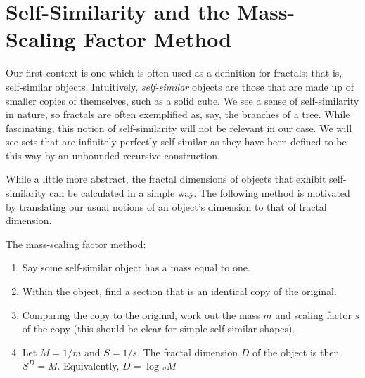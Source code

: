 \section{Self-Similarity and the Mass-Scaling Factor Method}
Our first context is one which is often used as a definition for fractals; that is, self-similar objects. Intuitively, \emph{self-similar} objects are those that are made up of smaller copies of themselves, such as a solid cube. We see a sense of self-similarity in nature, so fractals are often exemplified as, say, the branches of a tree. While fascinating, this notion of self-similarity will not be relevant in our case. We will see sets that are infinitely perfectly self-similar as they have been defined to be this way by an unbounded recursive construction.

While a little more abstract, the fractal dimensions of objects that exhibit self-similarity can be calculated in a simple way. The following method is motivated by translating our usual notions of an object's dimension to that of fractal dimension. 

\begin{prop} \label{MSF}
    The mass-scaling factor method:
    \begin{enumerate}
        \item Say some self-similar object has a mass equal to one.
        \item Within the object, find a section that is an identical copy of the original.
        \item Comparing the copy to the original, work out the mass $m$ and scaling factor $s$ of the copy (this should be clear for simple self-similar shapes).
        \item Let $M=1/m$ and $S=1/s$. The fractal dimension $D$ of the object is then $S^D=M.$ Equivalently, $D=\log{_SM}$
    \end{enumerate}
\end{prop}

